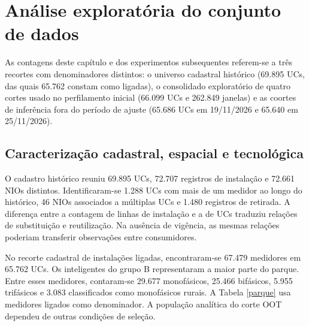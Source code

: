 \chapter{Análise exploratória do conjunto de dados}\label{anuxe1lise-exploratuxf3ria-do-conjunto-de-dados}
As contagens deste capítulo e dos experimentos subsequentes referem-se a três recortes com denominadores distintos: o universo cadastral histórico (69.895 UCs, das quais 65.762 constam como ligadas), o consolidado exploratório de quatro cortes usado no perfilamento inicial (66.099 UCs e 262.849 janelas) e as coortes de inferência fora do período de ajuste (65.686 UCs em 19/11/2026 e 65.640 em 25/11/2026).
\section{Caracterização cadastral, espacial e tecnológica}
O cadastro histórico reuniu 69.895 UCs, 72.707 registros de instalação e 72.661 NIOs distintos. Identificaram-se 1.288 UCs com mais de um medidor ao longo do histórico, 46 NIOs associados a múltiplas UCs e 1.480 registros de retirada. A diferença entre a contagem de linhas de instalação e a de UCs traduziu relações de substituição e reutilização. Na ausência de vigência, as mesmas relações poderiam transferir observações entre consumidores.

No recorte cadastral de instalações ligadas, encontraram-se 67.479 medidores em 65.762 UCs. Os inteligentes do grupo B representaram a maior parte do parque. Entre esses medidores, contaram-se 29.677 monofásicos, 25.466 bifásicos, 5.955 trifásicos e 3.083 classificados como monofásicos rurais. A Tabela \ref{parque} usa medidores ligados como denominador. A população analítica do corte OOT dependeu de outras condições de seleção.


